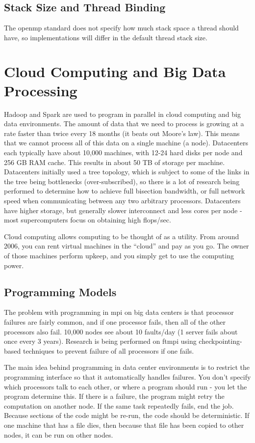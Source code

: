 \documentclass[10pt]{article}
\begin{document}
\begin{flushleft}
\subsection{Stack Size and Thread Binding}

The \gls{openmp} standard does not specify how much stack space a thread should have, so implementations will differ in the default thread stack size.

\section{Cloud Computing and Big Data Processing}

Hadoop and Spark are used to program in parallel in cloud computing and big data environments. The amount of data that we need to process is growing at a rate faster than twice every 18 months (it beats out Moore's law). This means that we cannot process all of this data on a single machine (a node). Datacenters each typically have about 10,000 machines, with 12-24 hard disks per node and 256 GB RAM cache. This results in about 50 TB of storage per machine. Datacenters initially used a tree topology, which is subject to some of the links in the tree being bottlenecks (over-subscribed), so there is a lot of research being performed to determine how to achieve full bisection bandwidth, or full network speed when communicating between any two arbitrary processors. Datacenters have higher storage, but generally slower interconnect and less cores per node - most supercomputers focus on obtaining high flops/sec.

Cloud computing allows computing to be thought of as a utility. From around 2006, you can rent virtual machines in the ``cloud'' and pay as you go. The owner of those machines perform upkeep, and you simply get to use the computing power. 

\subsection{Programming Models}

The problem with programming in \gls{mpi} on big data centers is that processor failures are fairly common, and if one processor fails, then all of the other processors also fail. 10,000 nodes see about 10 faults/day (1 server fails about once every 3 years). Research is being performed on \gls{ftmpi} using checkpointing-based techniques to prevent failure of all processors if one fails.

The main idea behind programming in data center environments is to restrict the programming interface so that it automatically handles failures. You don't specify which processors talk to each other, or where a program should run - you let the program determine this. If there is a failure, the program might retry the computation on another node. If the same task repeatedly fails, end the job. Because sections of the code might be re-run, the code should be deterministic. If one machine that has a file dies, then because that file has been copied to other nodes, it can be run on other nodes. 


\end{flushleft}
\end{document}
